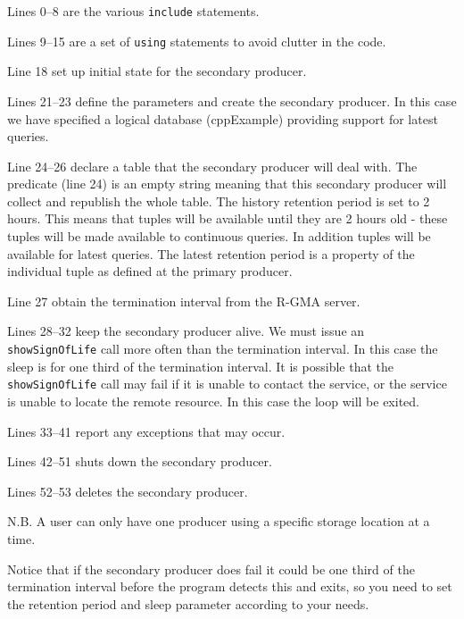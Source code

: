 Lines 0--8 are the various \texttt{include} statements.

Lines 9--15 are a set of \texttt{using} statements to avoid clutter
in the code.

Line 18 set up initial state for the secondary producer.

Lines 21--23 define the parameters and create the secondary
producer. In this case we have specified a logical database
(cppExample) providing support for latest queries.

Line 24--26 declare a table that the secondary producer will deal
with. The predicate (line 24) is an empty string meaning that this
secondary producer will collect and republish the whole table. The
history retention period is set to 2 hours. This means that tuples
will be available until they are 2 hours old - these tuples will be
made available to continuous queries. In addition tuples will be
available for latest queries. The latest retention period is a
property of the individual tuple as defined at the primary producer.

Line 27 obtain the termination interval from the R-GMA server.

Lines 28--32 keep the secondary producer alive. We must issue
an \texttt{showSignOfLife} call more often than the termination
interval. In this case the sleep is for one third of the termination
interval. It is possible that the \texttt{showSignOfLife} call may
fail if it is unable to contact the service, or the service is unable
to locate the remote resource. In this case the loop will be exited.

Lines 33--41 report any exceptions that may occur.

Lines 42--51 shuts down the secondary producer.

Lines 52--53 deletes the secondary producer.

N.B. A user can only have one producer using a specific storage
location at a time.

Notice that if the secondary producer does fail it could be one third
of the termination interval before the program detects this and exits,
so you need to set the retention period and sleep parameter according
to your needs.


